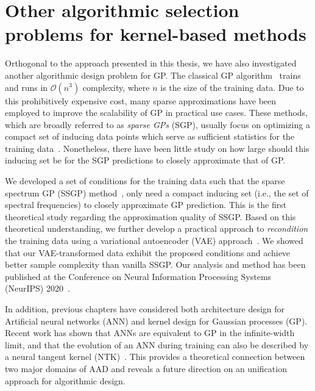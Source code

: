 \label{c6:future}
\section{Other algorithmic selection problems for kernel-based methods}
Orthogonal to the approach presented in this thesis, we have also investigated another algorithmic design problem for GP. The classical GP algorithm~\citep{Rasmussen06} trains and runs in $\mathcal{O}(n^3)$ complexity, where $n$ is the size of the training data. Due to this prohibitively expensive cost, many sparse approximations have been employed to improve the scalability of GP in practical use cases. These methods, which are broadly referred to as \textit{sparse GPs} (SGP), usually focus on optimizing a compact set of inducing data points which serve as sufficient statistics for the training data~\cite{Hoang14,Yarin15,Hensman13}. Nonetheless, there have been little study on how large should this inducing set be for the SGP predictions to closely approximate that of GP. 

We developed a set of conditions for the training data such that the sparse spectrum GP (SSGP) method~\cite{Yarin15}, only need a compact inducing set (i.e., the set of spectral frequencies) to closely approximate GP prediction. This is the first theoretical study regarding the approximation quality of SSGP. Based on this theoretical understanding, we further develop a practical approach to \textit{recondition} the training data using a variational autoencoder (VAE) approach~\cite{Kingma13}. We showed that our VAE-transformed data exhibit the proposed conditions and achieve better sample complexity than vanilla SSGP. Our analysis and method has been published at the Conference on Neural Information Processing Systems (NeurIPS) 2020~\cite{hoang2020revisiting}.

In addition, previous chapters have considered both architecture design for Artificial neural networks (ANN) and kernel design for Gaussian processes (GP). Recent work has shown that ANNs are equivalent to GP in the infinite-width limit, and that the evolution of an ANN during training can also be described by a neural tangent kernel (NTK)~\cite{jacot2018neural}. This provides a theoretical connection between two major domains of AAD and reveals a future direction on an unification approach for algorithmic design. 

